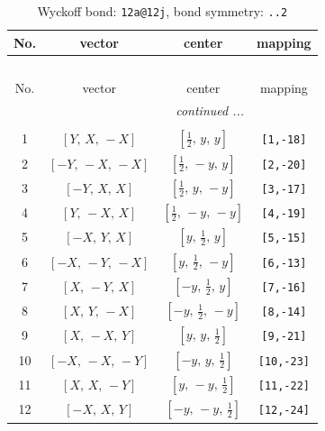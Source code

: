 \documentclass[fleqn,8pt]{jsarticle}
\begin{document}
\begin{longtable}{cccc}
\caption{Wyckoff bond: {\tt 12a@12j}, bond symmetry: {\tt ..2}}
 \\
 \hline \hline
No. & vector & center & mapping \\ \hline \endfirsthead

\multicolumn{3}{l}{\tablename\ \thetable{}} \\
 \hline \hline
No. & vector & center & mapping \\ \hline \endhead

 \hline \hline
\multicolumn{3}{r}{\footnotesize\it continued ...} \\ \endfoot

 \hline \hline
\multicolumn{3}{r}{} \\ \endlastfoot

1 & $\left[ Y,\, X,\, - X \right]$ & $\left[ \frac{1}{2},\, y,\, y \right]$ & {\tt [1,-18]} \\ \hline
2 & $\left[ - Y,\, - X,\, - X \right]$ & $\left[ \frac{1}{2},\, - y,\, y \right]$ & {\tt [2,-20]} \\ \hline
3 & $\left[ - Y,\, X,\, X \right]$ & $\left[ \frac{1}{2},\, y,\, - y \right]$ & {\tt [3,-17]} \\ \hline
4 & $\left[ Y,\, - X,\, X \right]$ & $\left[ \frac{1}{2},\, - y,\, - y \right]$ & {\tt [4,-19]} \\ \hline
5 & $\left[ - X,\, Y,\, X \right]$ & $\left[ y,\, \frac{1}{2},\, y \right]$ & {\tt [5,-15]} \\ \hline
6 & $\left[ - X,\, - Y,\, - X \right]$ & $\left[ y,\, \frac{1}{2},\, - y \right]$ & {\tt [6,-13]} \\ \hline
7 & $\left[ X,\, - Y,\, X \right]$ & $\left[ - y,\, \frac{1}{2},\, y \right]$ & {\tt [7,-16]} \\ \hline
8 & $\left[ X,\, Y,\, - X \right]$ & $\left[ - y,\, \frac{1}{2},\, - y \right]$ & {\tt [8,-14]} \\ \hline
9 & $\left[ X,\, - X,\, Y \right]$ & $\left[ y,\, y,\, \frac{1}{2} \right]$ & {\tt [9,-21]} \\ \hline
10 & $\left[ - X,\, - X,\, - Y \right]$ & $\left[ - y,\, y,\, \frac{1}{2} \right]$ & {\tt [10,-23]} \\ \hline
11 & $\left[ X,\, X,\, - Y \right]$ & $\left[ y,\, - y,\, \frac{1}{2} \right]$ & {\tt [11,-22]} \\ \hline
12 & $\left[ - X,\, X,\, Y \right]$ & $\left[ - y,\, - y,\, \frac{1}{2} \right]$ & {\tt [12,-24]} \\
\end{longtable}
\end{document}
